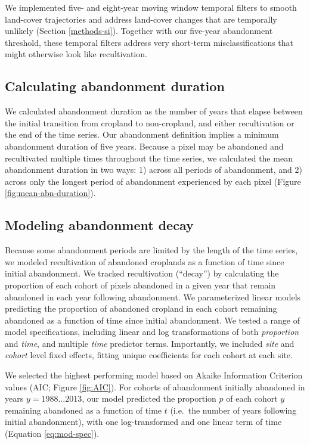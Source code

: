 \documentclass[9pt,twocolumn,twoside,]{pnas-new}
\begin{document}
We implemented five- and eight-year moving window temporal filters to
smooth land-cover trajectories and address land-cover changes that are
temporally unlikely (Section \ref{methods-si}). Together with our
five-year abandonment threshold, these temporal filters address very
short-term misclassifications that might otherwise look like
recultivation.

\hypertarget{calculating-abandonment-duration}{%
\subsection{Calculating abandonment
duration}\label{calculating-abandonment-duration}}

We calculated abandonment duration as the number of years that elapse
between the initial transition from cropland to non-cropland, and either
recultivation or the end of the time series. Our abandonment definition
implies a minimum abandonment duration of five years. Because a pixel
may be abandoned and recultivated multiple times throughout the time
series, we calculated the mean abandonment duration in two ways: 1)
across all periods of abandonment, and 2) across only the longest period
of abandonment experienced by each pixel (Figure
\ref{fig:mean-abn-duration}).

\hypertarget{modeling-abandonment-decay}{%
\subsection{Modeling abandonment
decay}\label{modeling-abandonment-decay}}

Because some abandonment periods are limited by the length of the time
series, we modeled recultivation of abandoned croplands as a function of
time since initial abandonment. We tracked recultivation (``decay'') by
calculating the proportion of each cohort of pixels abandoned in a given
year that remain abandoned in each year following abandonment. We
parameterized linear models predicting the proportion of abandoned
cropland in each cohort remaining abandoned as a function of time since
initial abandonment. We tested a range of model specifications,
including linear and log transformations of both \emph{proportion} and
\emph{time}, and multiple \emph{time} predictor terms. Importantly, we
included \emph{site} and \emph{cohort} level fixed effects, fitting
unique coefficients for each cohort at each site.

We selected the highest performing model based on Akaike Information
Criterion values (AIC; Figure \ref{fig:AIC}). For cohorts of abandonment
initially abandoned in years \(y = 1988 ... 2013\), our model predicted
the proportion \(p\) of each cohort \(y\) remaining abandoned as a
function of time \(t\) (i.e.~the number of years following initial
abandonment), with one log-transformed and one linear term of time
(Equation \ref{eq:mod-spec}).
\end{document}
